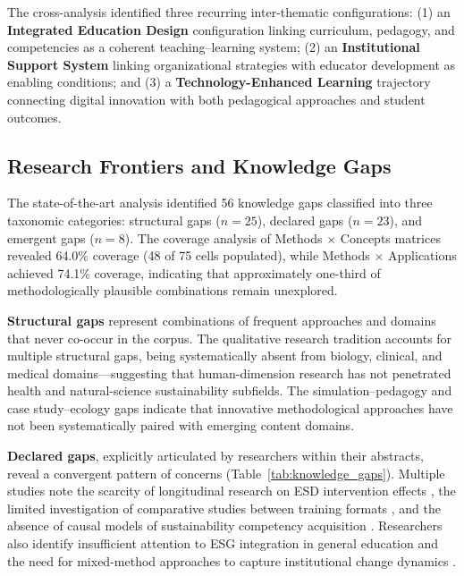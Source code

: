 \documentclass[pdflatex,sn-basic]{sn-jnl}%
\begin{document}
The cross-analysis identified three recurring inter-thematic configurations: (1) an \textbf{Integrated Education Design} configuration linking curriculum, pedagogy, and competencies as a coherent teaching--learning system; (2) an \textbf{Institutional Support System} linking organizational strategies with educator development as enabling conditions; and (3) a \textbf{Technology-Enhanced Learning} trajectory connecting digital innovation with both pedagogical approaches and student outcomes.

\subsection{Research Frontiers and Knowledge Gaps}

The state-of-the-art analysis identified 56 knowledge gaps classified into three taxonomic categories: structural gaps ($n = 25$), declared gaps ($n = 23$), and emergent gaps ($n = 8$). The coverage analysis of Methods $\times$ Concepts matrices revealed 64.0\% coverage (48 of 75 cells populated), while Methods $\times$ Applications achieved 74.1\% coverage, indicating that approximately one-third of methodologically plausible combinations remain unexplored.

\textbf{Structural gaps} represent combinations of frequent approaches and domains that never co-occur in the corpus. The qualitative research tradition accounts for multiple structural gaps, being systematically absent from biology, clinical, and medical domains---suggesting that human-dimension research has not penetrated health and natural-science sustainability subfields. The simulation--pedagogy and case study--ecology gaps indicate that innovative methodological approaches have not been systematically paired with emerging content domains.

\textbf{Declared gaps}, explicitly articulated by researchers within their abstracts, reveal a convergent pattern of concerns (Table~\ref{tab:knowledge_gaps}). Multiple studies note the scarcity of longitudinal research on ESD intervention effects \cite{brassler_interdisciplinary_2025, collado_innovation_2022}, the limited investigation of comparative studies between training formats \cite{brassler_students_2021}, and the absence of causal models of sustainability competency acquisition \cite{abdullahi_impact_2024}. Researchers also identify insufficient attention to ESG integration in general education \cite{chien_evaluating_2025} and the need for mixed-method approaches to capture institutional change dynamics \cite{da_costa_addressing_2025}.
\end{document}
